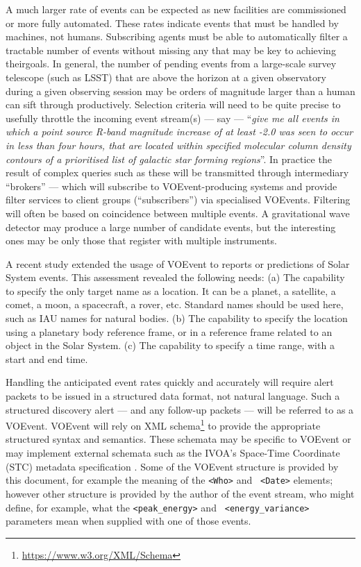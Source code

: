 \documentclass[11pt,a4paper]{ivoa}
\begin{document}
A much larger rate of events can be expected as new facilities are commissioned
or more fully automated. These rates indicate events that must be handled by
machines, not humans. Subscribing agents must be able to automatically filter a
tractable number of events without missing any that may be key to achieving
theirgoals. In general, the number of pending events from a large-scale survey
telescope (such as LSST) that are above the horizon at a given observatory
during a given observing session may be orders of magnitude larger than a human
can sift through productively. Selection criteria will need to be quite precise
to usefully throttle the incoming event stream(s) --- say --- ``\emph{give me
all events in which a point source R-band magnitude increase of at least -2.0
was seen to occur in less than four hours, that are located within specified
molecular column density contours of a prioritised list of galactic star forming
regions}''. In practice the result of complex queries such as these will be
transmitted through intermediary ``brokers'' --- which will subscribe to
VOEvent-producing systems and provide filter services to client groups
(``subscribers'') via specialised VOEvents. Filtering will often be based on
coincidence between multiple events. A gravitational wave detector may produce
a large number of candidate events, but the interesting ones may be only those
that register with multiple instruments.

A recent study \citep{2018arXiv181112680C} extended the usage of VOEvent to
reports or predictions of Solar System events. This assessment revealed the
following needs: (a) The capability to specify the only target name as a
location. It can be a planet, a satellite, a comet, a moon, a spacecraft, a
rover, etc. Standard names should be used here, such as IAU names for natural
bodies. (b) The capability to specify the location using a planetary body
reference frame, or in a reference frame related to an object in the Solar
System. (c) The capability to specify a time range, with a start and end time.

Handling the anticipated event rates quickly and accurately will require alert
packets to be issued in a structured data format, not natural language. Such a
structured discovery alert --- and any follow-up packets --- will be referred
to as a VOEvent. VOEvent will rely on XML schema\footnote{
\url{https://www.w3.org/XML/Schema}} to provide the appropriate structured
syntax and semantics. These schemata may be specific to VOEvent or may implement
external schemata such as the IVOA's Space-Time Coordinate (STC) metadata
specification \citep{2007ivoa.spec.1030R}. Some of the VOEvent structure is
provided by this document, for example the meaning of the {\tt <Who>} and {\tt
<Date>} elements; however other structure is provided by the author of the event
stream, who might define, for example, what the {\tt <peak\_energy>} and {\tt
<energy\_variance>} parameters mean when supplied with one of those events.
\end{document}
